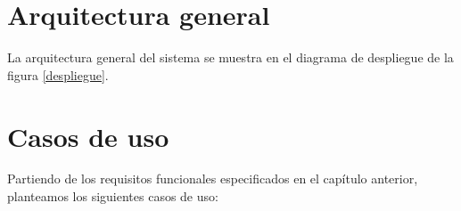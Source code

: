 
\section{Arquitectura general}

La arquitectura general del sistema se muestra en el diagrama de despliegue de la figura \ref{despliegue}.


\section{Casos de uso}

Partiendo de los requisitos funcionales especificados en el capítulo anterior, planteamos los siguientes casos de uso:


